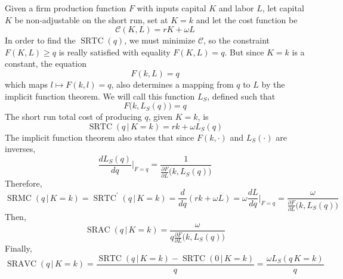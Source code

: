 \documentclass{article}
\DeclareMathOperator{\SRTC}{SRTC}
\DeclareMathOperator{\SRMC}{SRMC}
\DeclareMathOperator{\SRAC}{SRAC}
\DeclareMathOperator{\SRAVC}{SRAVC}
\begin{document}
      \begin{example}
        \label{ex:capital-and-labour-in-a-production-function}
        Given a firm production function $F$ with inputs capital $K$ and labor $L$, let capital $K$ be non-adjustable on the short run, set at $K=k$ and let the cost function be
        \begin{equation}
          \mathcal{C}(K, L) = r K + \omega L
        \end{equation}
        In order to find the $\SRTC(q)$, we must minimize $\mathcal{C}$, so the constraint $F(K, L) \geq q$ is really satisfied with equality $F(K, L) = q$. But since $K=k$ is a constant, the equation
        \begin{equation}
          F(k, L) = q
        \end{equation}
        which maps $l \mapsto F(k, l) = q$, also determines a mapping from $q$ to $L$ by the implicit function theorem. We will call this function $L_S$, defined such that
        \begin{equation}
          F\big( k, L_S (q)\big) = q
        \end{equation}
        The short run total cost of producing $q$, given $K=k$, is 
        \begin{equation}
          \SRTC(q\,|\,K=k) = r k + \omega L_S (q)
        \end{equation}
        The implicit function theorem also states that since $F(k, \cdot)$ and $L_S (\cdot)$ are inverses, 
        \begin{equation}
          \frac{d L_S (q)}{d q} \bigg|_{F = q} = \frac{1}{\frac{\partial F}{\partial L} \big(k, L_S (q)\big)}
        \end{equation}
        Therefore, 
        \begin{equation}
          \SRMC(q\,|\,K=k) = \SRTC^\prime (q\,|\,K=k) = \frac{d}{dq} (r k + \omega L) = \omega \frac{d L}{d q} \bigg|_{F=q} = \frac{\omega}{\frac{\partial F}{\partial L} \big(k, L_S (q)\big)}
        \end{equation}
        Then, 
        \begin{equation}
          \SRAC(q\,|\,K=k) = \frac{\omega}{q \frac{\partial F}{\partial L} \big(k, L_S (q)\big)}
        \end{equation}
        Finally, 
        \begin{equation}
          \SRAVC(q\,|\,K=k) = \frac{\SRTC(q\,|\,K=k) - \SRTC(0\,|\,K=k)}{q} = \frac{\omega L_S (q\,K=k)}{q}
        \end{equation}
      \end{example}
\end{document}
